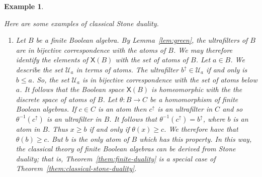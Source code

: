 \documentclass[a4paper]{amsart}
\newtheorem{example}[theorem]{Example}
\begin{document}
\begin{example}\label{ex:some-stone-spaces} 
{\em Here are some examples of classical Stone duality.

\begin{enumerate}

\item Let $B$ be a finite Boolean algebra.
By Lemma~\ref{lem:green}, the ultrafilters of $B$ are in bijective correspondence with the atoms of $B$.
We may therefore identify the elements of $\mathsf{X}(B)$ with the set of atoms of $B$.
Let $a \in B$. We describe the set $\mathscr{U}_{a}$ in terms of atoms.
The ultrafilter $b^{\uparrow} \in \mathscr{U}_{a}$ if and only is $b \leq a$.
So, the set $\mathscr{U}_{a}$ is in bijective correspondence with the set of atoms below $a$.
It follows that the Boolean space $\mathsf{X}(B)$ is homeomorphic with the the discrete space of atoms of $B$.
Let $\theta \colon B \rightarrow C$ be a homomorphism of finite Boolean algebras.
If $c \in C$ is an atom then $c^{\uparrow}$ is an ultrafilter in $C$ and so $\theta^{-1}(c^{\uparrow})$ is an ultrafilter in $B$.
It follows that $\theta^{-1}(c^{\uparrow}) = b^{\uparrow}$, where $b$ is an atom in $B$.
Thus $x \geq b$ if and only if $\theta (x) \geq c$.
We therefore have that $\theta (b) \geq c$.
But $b$ is the only atom of $B$ which has this property.
In this way, the classical theory of finite Boolean algebras can be derived from Stone duality;
that is, Theorem~\ref{them:finite-duality} is a special case of Theorem~\ref{them:classical-stone-duality}.


\end{enumerate}}
\end{example}
\end{document}
